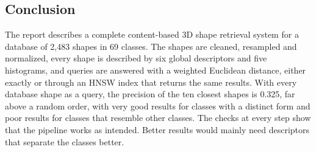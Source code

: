 \documentclass[10pt,a4paper]{article}
\begin{document}
\subsection{Conclusion}
The report describes a complete content-based 3D shape retrieval system for a database of 2,483 shapes in 69 classes. The shapes
are cleaned, resampled and normalized, every shape is described by six global descriptors and five histograms, and queries are
answered with a weighted Euclidean distance, either exactly or through an HNSW index that returns the same results. With every
database shape as a query, the precision of the ten closest shapes is 0.325, far above a random order, with very good results for
classes with a distinct form and poor results for classes that resemble other classes. The checks at every step show that the
pipeline works as intended. Better results would mainly need descriptors that separate the classes better.

\clearpage
\end{document}
